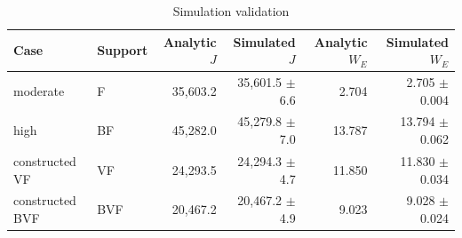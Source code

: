 \begin{table}[ht]
\centering\footnotesize
\caption{Simulation validation}\label{tab:des}
\begin{tabular}{@{}llrrrr@{}}\toprule
Case & Support & Analytic $J$ & Simulated $J$ & Analytic $W_E$ & Simulated $W_E$\\\midrule
moderate & F & 35,603.2 & 35,601.5 $\pm$ 6.6 & 2.704 & 2.705 $\pm$ 0.004\\
high & BF & 45,282.0 & 45,279.8 $\pm$ 7.0 & 13.787 & 13.794 $\pm$ 0.062\\
constructed VF & VF & 24,293.5 & 24,294.3 $\pm$ 4.7 & 11.850 & 11.830 $\pm$ 0.034\\
constructed BVF & BVF & 20,467.2 & 20,467.2 $\pm$ 4.9 & 9.023 & 9.028 $\pm$ 0.024\\
\bottomrule\end{tabular}
\end{table}
